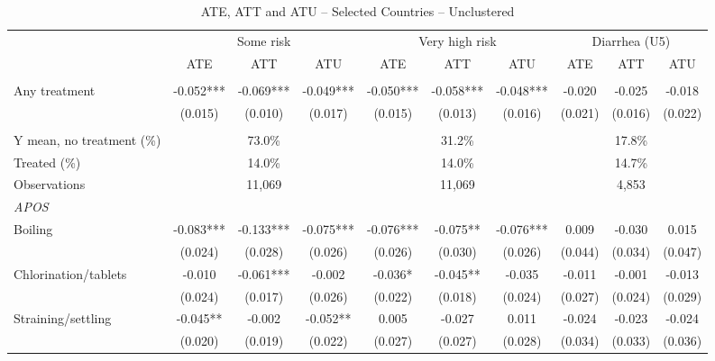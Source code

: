 \begin{table}[htbp]
\centering
\caption{ATE, ATT and ATU -- Selected Countries -- Unclustered}
\label{tab:ate-att-atu-selected-countries-iid-aggregated}
\scriptsize
\setlength{\tabcolsep}{4pt}
\renewcommand{\arraystretch}{0.92}
\begin{adjustbox}{max width=\linewidth}
\begin{tabular}{lccccccccc}
\hline\hline
 & \multicolumn{3}{c}{Some risk} & \multicolumn{3}{c}{Very high risk} & \multicolumn{3}{c}{Diarrhea (U5)} \\
\cmidrule(lr){2-4}\cmidrule(lr){5-7}\cmidrule(lr){8-10}
 & ATE & ATT & ATU & ATE & ATT & ATU & ATE & ATT & ATU \\
\addlinespace[3pt]
\multicolumn{10}{l}{\textit{IRM}} \\
Any treatment & -0.052*** & -0.069*** & -0.049*** & -0.050*** & -0.058*** & -0.048*** & -0.020 & -0.025 & -0.018 \\
 & (0.015) & (0.010) & (0.017) & (0.015) & (0.013) & (0.016) & (0.021) & (0.016) & (0.022) \\
\addlinespace[6pt]
\multicolumn{10}{l}{\textit{Descriptive statistics and sample}} \\
Y mean, no treatment (\%) & \multicolumn{3}{c}{73.0\%} & \multicolumn{3}{c}{31.2\%} & \multicolumn{3}{c}{17.8\%} \\
Treated (\%) & \multicolumn{3}{c}{14.0\%} & \multicolumn{3}{c}{14.0\%} & \multicolumn{3}{c}{14.7\%} \\
Observations & \multicolumn{3}{c}{11,069} & \multicolumn{3}{c}{11,069} & \multicolumn{3}{c}{4,853} \\
\midrule
\multicolumn{10}{l}{\textit{APOS}} \\
Boiling & -0.083*** & -0.133*** & -0.075*** & -0.076*** & -0.075** & -0.076*** & 0.009 & -0.030 & 0.015 \\
 & (0.024) & (0.028) & (0.026) & (0.026) & (0.030) & (0.026) & (0.044) & (0.034) & (0.047) \\
Chlorination/tablets & -0.010 & -0.061*** & -0.002 & -0.036* & -0.045** & -0.035 & -0.011 & -0.001 & -0.013 \\
 & (0.024) & (0.017) & (0.026) & (0.022) & (0.018) & (0.024) & (0.027) & (0.024) & (0.029) \\
Straining/settling & -0.045** & -0.002 & -0.052** & 0.005 & -0.027 & 0.011 & -0.024 & -0.023 & -0.024 \\
 & (0.020) & (0.019) & (0.022) & (0.027) & (0.027) & (0.028) & (0.034) & (0.033) & (0.036) \\

\end{tabular}
\end{adjustbox}
\end{table}
